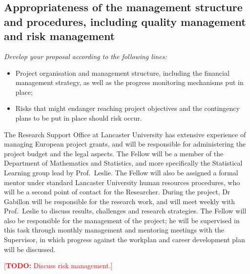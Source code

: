 \documentclass[a4paper,11pt]{article}
\newcommand{\TODO}[1]{{\textcolor{red}{[\textbf{TODO:} #1]}}}
\begin{document}
\subsection{Appropriateness of the management structure and procedures, including quality management and risk management}

{\em
Develop your proposal according to the following lines:
\begin{itemize}
\item Project organisation and management structure, including the financial management strategy, as well as the progress monitoring mechanisms put in place;
\item Risks that might endanger reaching project objectives and the contingency plans to be put in place should risk occur.
\end{itemize}
}

The Research Support Office at Lancaster University has extensive experience of managing European project grants, and will be responsible for administering the project budget and the legal aspects.  The Fellow will be a member of the Department of Mathematics and Statistics, and more specifically the Statistical Learning group lead by Prof.\ Leslie.  The Fellow will also be assigned a formal mentor under standard Lancaster University human resources procedures, who will be a second point of contact for the Researcher.  During the project, Dr Gabillon will be responsible for the research work, and will meet weekly with Prof.\ Leslie to discuss results, challenges and research strategies.  The Fellow will also be responsible for the management of the project; he will be supervised in this task through monthly management and mentoring meetings with the Supervisor, in which progress against the workplan and career development plan will be discussed.

\TODO{Discuss risk management.}
\end{document}
